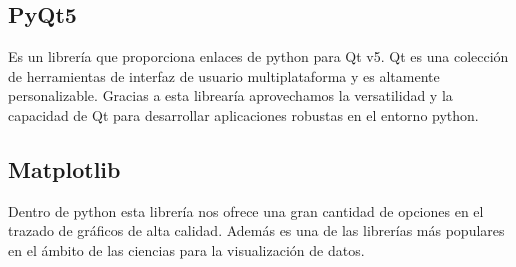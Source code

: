 \subsection{PyQt5}
Es un librería que proporciona enlaces de python para Qt v5. Qt es una colección de herramientas de interfaz de usuario multiplataforma y es altamente personalizable. Gracias a esta librearía aprovechamos la versatilidad y la capacidad de Qt para desarrollar aplicaciones robustas en el entorno python.

\subsection{Matplotlib}
Dentro de python esta librería nos ofrece una gran cantidad de opciones en el trazado de gráficos de alta calidad. Además es una de las librerías más populares en el ámbito de las ciencias para la visualización de datos.

